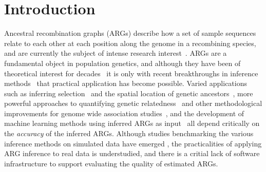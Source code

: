 \documentclass[unnumsec,webpdf,contemporary,large,namedate]{oup-authoring-template}%
\begin{document}
 \maketitle 

\section{Introduction} 
Ancestral recombination graphs (ARGs) describe how a set of sample
sequences relate to each other at each position along the genome in a recombining
species, and are currently the subject of intense research 
interest~\citep{brandt2024promise,lewanski2024era,nielsen2024inference,
wong2024general}. ARGs are a fundamental object in population genetics,
and although they have been of theoretical interest for
decades~\citep{Hudson1983,Griffiths1997} it is only with recent breakthroughs
in inference methods~\citep{rasmussen2014genome,
speidel2019method,kelleher2019inferring,wohns2022unified,zhang2023biobank,
gunnarsson2024scalable,deng2024robust} that practical application has 
become possible. Varied applications
such as inferring selection~\citep{stern2019approximate,hejase2022deep} and 
the spatial 
location of genetic
ancestors~\citep{osmond2024estimating,deraje2024inferring,grundler2024geographic},
more powerful approaches to quantifying genetic 
relatedness~\citep{fan2022genealogical,zhang2023biobank,gunnarsson2024scalable,lehmann2025on}
and other methodological improvements for genome wide association 
studies~\citep{nowbandegani2023extremely,link2023tree},
and the development of machine learning methods using inferred
ARGs as input~\citep{hejase2022deep,pearson2023local,korfmann2024simultaneous,
whitehouse2024tree} all depend critically on the \emph{accuracy}
of the inferred ARGs. 
Although studies benchmarking the various inference methods on 
simulated data have emerged 
\citep{brandt2022evaluation,deng2024robust,peng2024evaluating},
the practicalities of applying ARG inference to real data is 
understudied, and there is a critial lack of software infrastructure
to support evaluating the quality of estimated ARGs.
\end{document}
